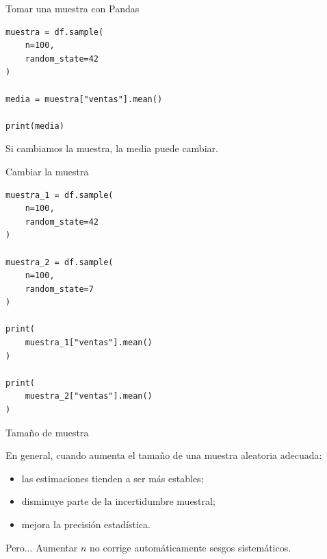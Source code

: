 \documentclass[aspectratio=169,11pt]{beamer}
\begin{document}

\begin{frame}[fragile]{Tomar una muestra con Pandas}

\begin{lstlisting}
muestra = df.sample(
    n=100,
    random_state=42
)

media = muestra["ventas"].mean()

print(media)
\end{lstlisting}

Si cambiamos la muestra, la media puede cambiar.

\end{frame}


\begin{frame}[fragile]{Cambiar la muestra}

\begin{lstlisting}
muestra_1 = df.sample(
    n=100,
    random_state=42
)

muestra_2 = df.sample(
    n=100,
    random_state=7
)

print(
    muestra_1["ventas"].mean()
)

print(
    muestra_2["ventas"].mean()
)
\end{lstlisting}

\end{frame}


\begin{frame}{Tamaño de muestra}

En general, cuando aumenta el tamaño de una muestra aleatoria adecuada:

\begin{itemize}

    \item las estimaciones tienden a ser más estables;

    \item disminuye parte de la incertidumbre muestral;

    \item mejora la precisión estadística.

\end{itemize}

\vspace{0.4cm}

\begin{alertblock}{Pero...}
Aumentar $n$ no corrige automáticamente sesgos sistemáticos.
\end{alertblock}

\end{frame}
\end{document}
